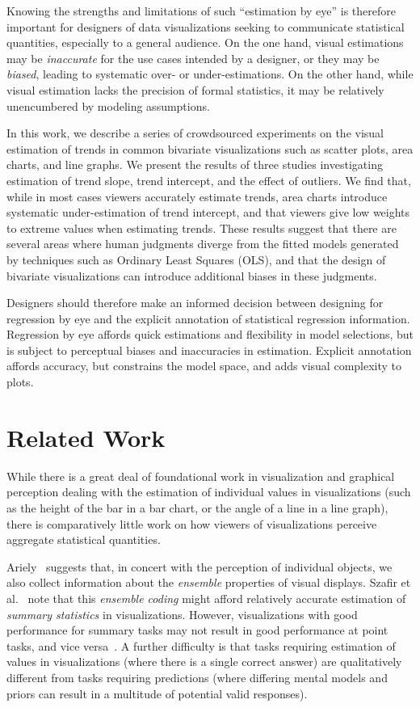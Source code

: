 \documentclass{sigchi}
\begin{document}
Knowing the strengths and limitations of such ``estimation by eye'' is therefore important for designers of data visualizations seeking to communicate statistical quantities, especially to a general audience. On the one hand, visual estimations may be \emph{inaccurate} for the use cases intended by a designer, or they may be \emph{biased}, leading to systematic over- or under-estimations. On the other hand, while visual estimation lacks the precision of formal statistics, it may be relatively unencumbered by modeling assumptions.

In this work, we describe a series of crowdsourced experiments on the visual estimation of trends in common bivariate visualizations such as scatter plots, area charts, and line graphs. We present the results of three studies investigating estimation of trend slope, trend intercept, and the effect of outliers. We find that, while in most cases viewers accurately estimate trends, area charts introduce systematic under-estimation of trend intercept, and that viewers give low weights to extreme values when estimating trends. These results suggest that there are several areas where human judgments diverge from the fitted models generated by techniques such as Ordinary Least Squares (OLS), and that the design of bivariate visualizations can introduce additional biases in these judgments.

Designers should therefore make an informed decision between designing for regression by eye and the explicit annotation of statistical regression information. Regression by eye affords quick estimations and flexibility in model selections, but is subject to perceptual biases and inaccuracies in estimation. Explicit annotation affords accuracy, but constrains the model space, and adds visual complexity to plots.

\section{Related Work}

While there is a great deal of foundational work in visualization and graphical perception dealing with the estimation of individual values in visualizations (such as the height of the bar in a bar chart, or the angle of a line in a line graph), there is comparatively little work on how viewers of visualizations perceive aggregate statistical quantities.

Ariely~\cite{ariely2001seeing} suggests that, in concert with the perception of individual objects, we also collect information about the \emph{ensemble} properties of visual displays. Szafir et al.~\cite{szafir2016four} note that this \emph{ensemble coding} might afford relatively accurate estimation of \emph{summary statistics} in visualizations. However, visualizations with good performance for summary tasks may not result in good performance at point tasks, and vice versa~\cite{albers2014task,fuchs2013evaluation}. A further difficulty is that tasks requiring estimation of values in visualizations (where there is a single correct answer) are qualitatively different from tasks requiring predictions (where differing mental models and priors can result in a multitude of potential valid responses).
\end{document}
